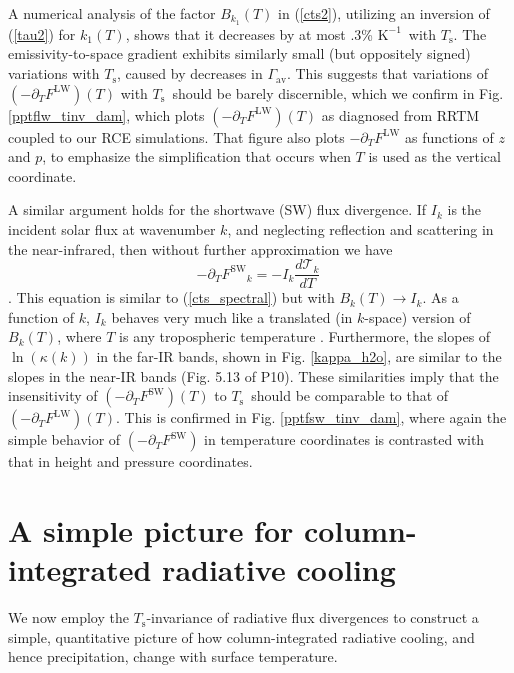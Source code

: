 \documentclass[10pt]{article}
\newcommand{\beqn}{\begin{equation}}
\newcommand{\eeqn}{\end{equation}}
\newcommand{\eqnref}[1]{(\ref{#1})}
\newcommand{\der}[2]{\ensuremath{\frac{d #1}{d #2}}}
\newcommand{\ppt}{\ensuremath{\partial_T}}
\newcommand{\FLW}{\ensuremath{F^\mathrm{LW}}}
\newcommand{\FSW}{\ensuremath{F^\mathrm{SW}}}
\newcommand{\trans}{\ensuremath{\mathcal{T}}}
\newcommand{\pierre}{P10}
\newcommand{\Ts}{\ensuremath{T_\mathrm{s}}}
\newcommand{\gammaav}{\ensuremath{\Gamma_\mathrm{av}}}
\newcommand{\Kinverse}{\ensuremath{\mathrm{K^{-1}}}}
\begin{document}
 	A numerical analysis of the factor $B_{k_1}(T)$ in \eqnref{cts2}, utilizing an inversion of \eqnref{tau2} for $k_1(T)$, shows that it decreases by at most .3\% \Kinverse\ with \Ts. The emissivity-to-space gradient  exhibits similarly small (but oppositely signed) variations with \Ts, caused by decreases in \gammaav. This suggests that variations of $(-\ppt \FLW)(T)$ with \Ts\ should be barely discernible, which we confirm in Fig.  \ref{pptflw_tinv_dam}, which plots $(-\ppt \FLW)(T)$ as diagnosed from RRTM coupled to our  RCE simulations.  That figure also plots 
$-\ppt \FLW$ as functions of $z$ and $p$, to emphasize the simplification that occurs when $T$ is used as the vertical coordinate.



A similar argument holds for the shortwave (SW) flux divergence. If $I_k$ is the incident solar flux at wavenumber $k$, and  neglecting reflection and scattering in the  near-infrared, 
then without further approximation we have
	\beqn
		-\ppt \FSW_k = - I_k \der{\trans_k}{T}
		\
	\eeqn
\citep[c.f.][eqn. 9.26]{thomas2002}. This equation is similar to  \eqnref{cts_spectral} but with $B_k(T) \rightarrow I_k$. As a function of $k$, $I_k$ behaves very much like a translated (in $k$-space) version of  $B_k(T)$,  where $T$ is any tropospheric temperature  \citep[cf. Fig. 3.2 of][]{hartmann1994book}. Furthermore, the slopes of $\ln(\kappa(k))$ in the far-IR bands, shown in Fig. \ref{kappa_h2o}, are similar to the slopes in the near-IR bands (Fig. 5.13 of \pierre). These similarities imply that the insensitivity of $(-\ppt \FSW)(T)$ to \Ts\ should be comparable to that of  $(-\ppt \FLW)(T)$.
 This is confirmed in Fig. \ref{pptfsw_tinv_dam}, where again the simple behavior of $(-\ppt \FSW)$ in temperature coordinates is contrasted with that in height and pressure coordinates.


		
\section{A simple picture for column-integrated radiative cooling} \label{sec_simple_Q}
	We now employ the \Ts-invariance of radiative flux divergences  to construct a simple, quantitative picture of how column-integrated radiative cooling, and hence precipitation,  change with surface temperature. 
	
\end{document}
